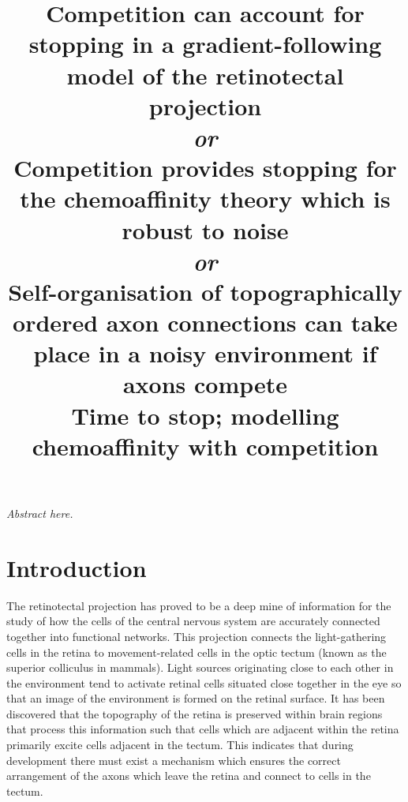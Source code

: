\documentclass[11pt, a4paper]{article}
\title {
  Competition can account for stopping in a gradient-following model
  of the retinotectal projection \\
  \emph{or} \\
  Competition provides stopping for the chemoaffinity
  theory which is robust to noise \\
  \emph{or} \\
  Self-organisation of topographically ordered axon connections can take place
  in a noisy environment if axons compete \\
  Time to stop; modelling chemoaffinity with competition \\
}
\date{} %
\author{\Authors}
\begin{document}
\setlength{\droptitle}{-1.8cm} %
\maketitle

\vspace{-1.8cm} %

\emph{Abstract here.}

\section{Introduction}

The retinotectal projection has proved to be a deep mine of information for
the study of how the cells of the central nervous system are accurately
connected together into functional networks. This projection connects the
light-gathering cells in the retina to movement-related cells in the optic
tectum (known as the superior colliculus in mammals). Light sources
originating close to each other in the environment tend to activate retinal
cells situated close together in the eye so that an image of the environment
is formed on the retinal surface. It has been discovered that the topography
of the retina is preserved within brain regions that process this information
such that cells which are adjacent within the retina primarily excite cells
adjacent in the tectum. This indicates that during development there must
exist a mechanism which ensures the correct arrangement of the axons which
leave the retina and connect to cells in the tectum.
\end{document}
